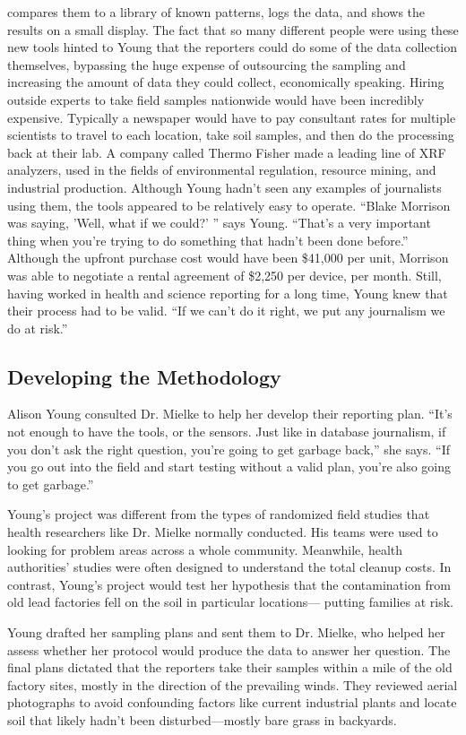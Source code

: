 compares them to a library of known patterns, logs the data, and shows
the results on a small display. The fact that so many different people were
using these new tools hinted to Young that the reporters could do some of
the data collection themselves, bypassing the huge expense of outsourcing
the sampling and increasing the amount of data they could collect, economically
speaking. Hiring outside experts to take field samples nationwide
would have been incredibly expensive. Typically a newspaper would have to
pay consultant rates for multiple scientists to travel to each location, take
soil samples, and then do the processing back at their lab.
A company called Thermo Fisher made a leading line of XRF analyzers, used
in the fields of environmental regulation, resource mining, and industrial
production. Although Young hadn't seen any examples of journalists using
them, the tools appeared to be relatively easy to operate. ``Blake Morrison
was saying, 'Well, what if we could?' '' says Young. ``That's a very important
thing when you're trying to do something that hadn't been done before.''
Although the upfront purchase cost would have been \$41,000 per unit,
Morrison was able to negotiate a rental agreement of \$2,250 per device, per
month. Still, having worked in health and science reporting for a long time,
Young knew that their process had to be valid. ``If we can't do it right, we put
any journalism we do at risk.''

\subsection{Developing the Methodology}
Alison Young consulted Dr. Mielke to help her develop their reporting plan.
``It's not enough to have the tools, or the sensors. Just like in database journalism,
if you don't ask the right question, you're going to get garbage back,''
she says. ``If you go out into the field and start testing without a valid plan,
you're also going to get garbage.''

Young's project was different from the types of randomized field studies
that health researchers like Dr. Mielke normally conducted. His teams were
used to looking for problem areas across a whole community. Meanwhile, health authorities' studies were often designed to understand the total
cleanup costs. In contrast, Young's project would test her hypothesis that
the contamination from old lead factories fell on the soil in particular locations—
putting families at risk.

Young drafted her sampling plans and sent them to Dr. Mielke, who helped
her assess whether her protocol would produce the data to answer her question.
The final plans dictated that the reporters take their samples within a
mile of the old factory sites, mostly in the direction of the prevailing winds.
They reviewed aerial photographs to avoid confounding factors like current
industrial plants and locate soil that likely hadn't been disturbed—mostly
bare grass in backyards.

